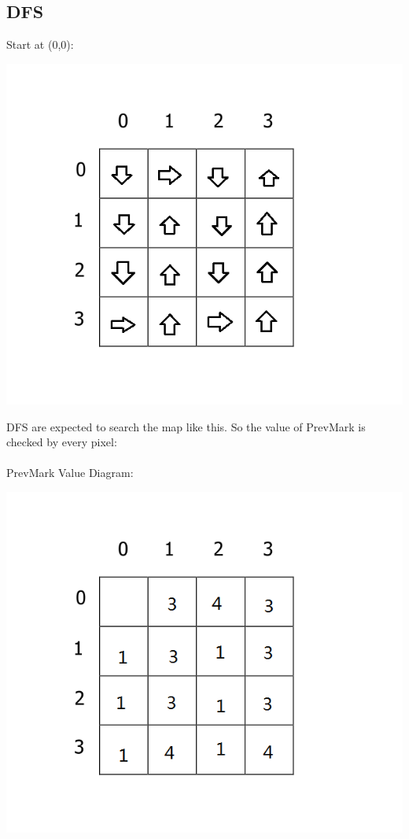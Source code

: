 \documentclass[11pt, a4paper]{report}
\begin{document}
\subsection{DFS}
Start at (0,0):
\begin{center}
\includegraphics[scale=0.4]{./image/Test1DFS.png}
\end{center}
DFS are expected to search the map like this. So the value of PrevMark is checked by every pixel:\\

\paragraph{}PrevMark Value Diagram:
\begin{center}
\includegraphics[scale=0.4]{./image/Test1DFSP.png}
\end{center}
\end{document}
